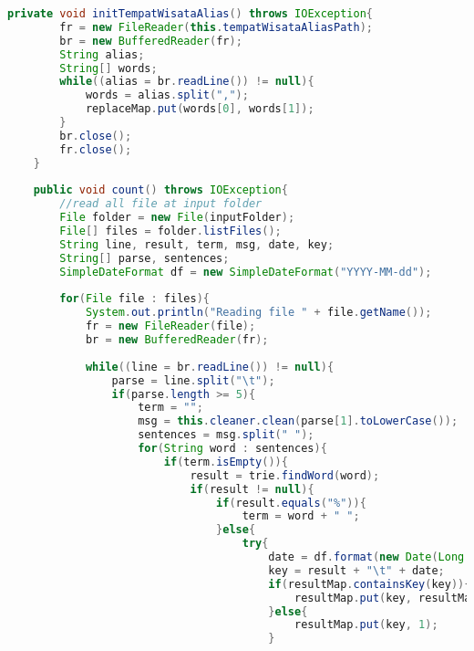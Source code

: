 \begin{lstlisting}[language=Java,basicstyle=\tiny,caption=Counter.java]
    private void initTempatWisataAlias() throws IOException{
        fr = new FileReader(this.tempatWisataAliasPath);
        br = new BufferedReader(fr);
        String alias;
        String[] words;
        while((alias = br.readLine()) != null){
            words = alias.split(",");
            replaceMap.put(words[0], words[1]);
        }
        br.close();
        fr.close();
    }
    
    public void count() throws IOException{
        //read all file at input folder
        File folder = new File(inputFolder);
        File[] files = folder.listFiles();
        String line, result, term, msg, date, key;
        String[] parse, sentences;
        SimpleDateFormat df = new SimpleDateFormat("YYYY-MM-dd");
        
        for(File file : files){
            System.out.println("Reading file " + file.getName());
            fr = new FileReader(file);
            br = new BufferedReader(fr);
            
            while((line = br.readLine()) != null){
                parse = line.split("\t");
                if(parse.length >= 5){
                    term = "";
                    msg = this.cleaner.clean(parse[1].toLowerCase());
                    sentences = msg.split(" ");
                    for(String word : sentences){
                        if(term.isEmpty()){
                            result = trie.findWord(word);
                            if(result != null){
                                if(result.equals("%")){
                                    term = word + " ";
                                }else{
                                    try{
                                        date = df.format(new Date(Long.parseLong(parse[parse.length - 1])));
                                        key = result + "\t" + date;
                                        if(resultMap.containsKey(key)){
                                            resultMap.put(key, resultMap.get(key) + 1);
                                        }else{
                                            resultMap.put(key, 1);
                                        }
                                        

\end{lstlisting}
